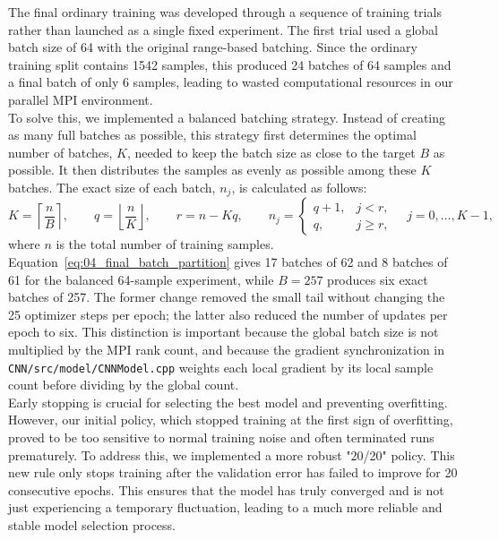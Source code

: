 The final ordinary training was developed through a sequence of training trials rather than launched as a single fixed experiment. The first trial used a global batch size of 64 with the original range-based batching. Since the ordinary training split contains 1542 samples, this produced 24 batches of 64 samples and a final batch of only 6 samples, leading to wasted computational resources in our parallel MPI environment.\\

To solve this, we implemented a balanced batching strategy. Instead of creating as many full batches as possible, this strategy first determines the optimal number of batches, $K$, needed to keep the batch size as close to the target $B$ as possible. It then distributes the samples as evenly as possible among these $K$ batches. The exact size of each batch, $n_j$, is calculated as follows:
\begin{equation}
    K=\left\lceil\frac{n}{B}\right\rceil,
    \qquad q=\left\lfloor\frac{n}{K}\right\rfloor,
    \qquad r=n-Kq,
    \qquad
    n_j=\begin{cases}
        q+1, & j<r,\\
        q, & j\geq r,
    \end{cases}
    \quad j=0,\ldots,K-1,
    \label{eq:04_final_batch_partition}
\end{equation} 
where $n$ is the total number of training samples. Equation~\eqref{eq:04_final_batch_partition} gives 17 batches of 62 and 8 batches of 61 for the balanced 64-sample experiment, while $B=257$ produces six exact batches of 257. The former change removed the small tail without changing the 25 optimizer steps per epoch; the latter also reduced the number of updates per epoch to six. This distinction is important because the global batch size is not multiplied by the MPI rank count, and because the gradient synchronization in \texttt{CNN/src/model/CNNModel.cpp} weights each local gradient by its local sample count before dividing by the global count.\\

Early stopping is crucial for selecting the best model and preventing overfitting. However, our initial policy, which stopped training at the first sign of overfitting, proved to be too sensitive to normal training noise and often terminated runs prematurely. To address this, we implemented a more robust "20/20" policy. This new rule only stops training after the validation error has failed to improve for 20 consecutive epochs. This ensures that the model has truly converged and is not just experiencing a temporary fluctuation, leading to a much more reliable and stable model selection process.\\

